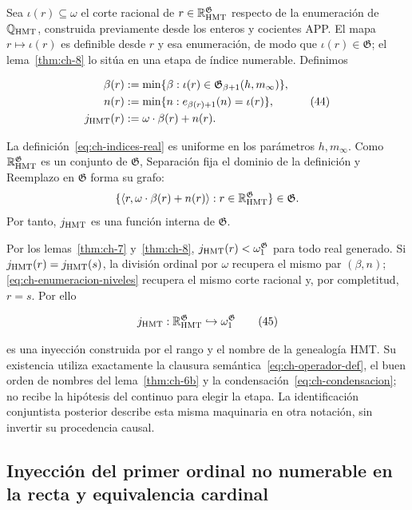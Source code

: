 Sea \(\iota(r)\subseteq\omega\) el corte racional de
\(r\in\mathbb R_{\rm HMT}^{\mathfrak G}\) respecto de la enumeración de
\(\mathbb Q_{\rm HMT}\), construida previamente desde los enteros y cocientes
APP. El mapa \(r\mapsto\iota(r)\) es definible desde \(r\) y esa enumeración,
de modo que \(\iota(r)\in\mathfrak G\); el lema~\ref{thm:ch-8} lo sitúa en una etapa de
índice numerable. Definimos

\[
 \begin{aligned}
  \beta(r)&:=\min\{\beta:
       \iota(r)\in\mathfrak G_{\beta+1}(h,m_\infty)\},\\
  n(r)&:=\min\{n:e_{\beta(r)+1}(n)=\iota(r)\},\\
  j_{\rm HMT}(r)&:=\omega\cdot\beta(r)+n(r).
 \end{aligned}
\tag{44}\label{eq:ch-indices-real}
\]

La definición~\eqref{eq:ch-indices-real} es uniforme en los parámetros \(h,m_\infty\). Como
\(\mathbb R_{\rm HMT}^{\mathfrak G}\) es un conjunto de \(\mathfrak G\),
Separación fija el dominio de la definición y Reemplazo en \(\mathfrak G\)
forma su grafo:
\[
 \{\langle r,\omega\cdot\beta(r)+n(r)\rangle:
 r\in\mathbb R_{\rm HMT}^{\mathfrak G}\}\in\mathfrak G.
\]
Por tanto, \(j_{\rm HMT}\) es una función interna de \(\mathfrak G\).

Por los lemas~\ref{thm:ch-7} y~\ref{thm:ch-8},
\(j_{\rm HMT}(r)<\omega_1^{\mathfrak G}\) para todo
real generado. Si \(j_{\rm HMT}(r)=j_{\rm HMT}(s)\), la división ordinal por
\(\omega\) recupera el mismo par \((\beta,n)\); \eqref{eq:ch-enumeracion-niveles} recupera el mismo corte
racional y, por completitud, \(r=s\). Por ello

\[
 j_{\rm HMT}:\mathbb R_{\rm HMT}^{\mathfrak G}
 \hookrightarrow\omega_1^{\mathfrak G}
\tag{45}\label{eq:ch-inyeccion-j}
\]

es una inyección construida por el rango y el nombre de la genealogía HMT. Su
existencia utiliza exactamente la clausura semántica~\eqref{eq:ch-operador-def}, el buen orden de
nombres del lema~\ref{thm:ch-6b} y la condensación~\eqref{eq:ch-condensacion}; no recibe la hipótesis del continuo para elegir la
etapa. La identificación conjuntista posterior describe esta misma
maquinaria en otra notación, sin invertir su procedencia causal.

\subsection{Inyección del primer ordinal no numerable en la recta y equivalencia cardinal}

